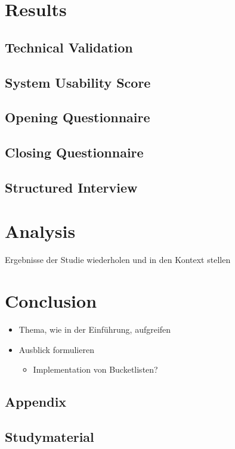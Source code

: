 \documentclass[12pt,numbers=noenddot,parskip,bibliography=totocnumbered,listof=totocnumbered]{scrreprt}
\begin{document}
\chapter{Results}

\section{Technical Validation}

\section{System Usability Score}

\section{Opening Questionnaire}

\section{Closing Questionnaire}

\section{Structured Interview}

\chapter{Analysis}
Ergebnisse der Studie wiederholen und in den Kontext stellen

\chapter{Conclusion}
\begin{itemize} 
	\item Thema, wie in der Einführung, aufgreifen
	\item Ausblick formulieren
	\begin{itemize} 
		\item Implementation von Bucketlisten?
	\end{itemize} 
\end{itemize} 


\begin{appendix} 
\chapter{Appendix}
\newpage
\section{Studymaterial}
\vspace*{\fill}
\label{lab:Studymaterial}
\vspace*{\fill}
\end{appendix}
\end{document}
